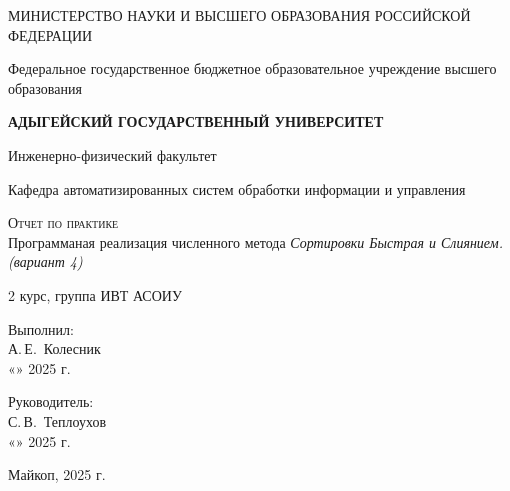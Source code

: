 \documentclass[12pt,a4paper]{scrartcl}
\begin{document}
\begin{titlepage}
		\begin{center}
			\large
			МИНИСТЕРСТВО НАУКИ И ВЫСШЕГО ОБРАЗОВАНИЯ РОССИЙСКОЙ ФЕДЕРАЦИИ
			
			Федеральное государственное бюджетное образовательное учреждение высшего образования
			
			\textbf{АДЫГЕЙСКИЙ ГОСУДАРСТВЕННЫЙ УНИВЕРСИТЕТ}
			\vspace{0.25cm}
			
			Инженерно-физический факультет
			
			Кафедра автоматизированных систем обработки информации и управления
			\vfill

			\vfill
			
			\textsc{Отчет по практике}\\[5mm]
			
			{\LARGE Программаная реализация численного метода \textit{Сортировки Быстрая и Слиянием. (вариант 4)}}
			\bigskip
			
			2 курс, группа ИВТ АСОИУ
		\end{center}
		\vfill
		
		\newlength{\ML}
		\hfill\begin{minipage}{0.5\textwidth}
			Выполнил:\\
			\underline{\hspace{\ML}} А.\,Е.~Колесник\\
			«\underline{\hspace{0.7cm}}» \underline{\hspace{2cm}} 2025 г.
		\end{minipage}%
		\bigskip
		
		\hfill\begin{minipage}{0.5\textwidth}
			Руководитель:\\
			\underline{\hspace{\ML}} С.\,В.~Теплоухов\\
			«\underline{\hspace{0.7cm}}» \underline{\hspace{2cm}} 2025 г.
		\end{minipage}%
		\vfill
		
		\begin{center}
			Майкоп, 2025 г.
		\end{center}
	\end{titlepage}
 
\end{document}
